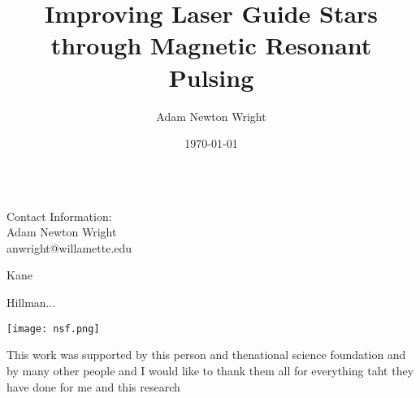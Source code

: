 \documentclass[30pt, a0paper, landscape]{tikzposter}
\title{Improving Laser Guide Stars through Magnetic Resonant Pulsing}
\author{Adam Newton Wright}
\date{\today}
\institute{Willamette University}
\begin{document}
 
\maketitle


 
{
}
 
\begin{columns}
\centering

\end{columns}


\block[]{}
{
	\begin{minipage}{.33\textwidth}
		Contact Information:\\
		Adam Newton Wright\\
		anwright@willamette.edu
	\end{minipage}
	\begin{minipage}{.33\textwidth}
		\begin{description}
			\item Kane
			\item Hillman...
		\end{description}
	\end{minipage}
	\begin{minipage}{.33\textwidth}
		\begin{minipage}{.15\textwidth}
			\texttt{[image: nsf.png]}
		\end{minipage}
		\begin{minipage}{.7\textwidth}
			This work was supported by this person and thenational science foundation and by many other people and I would like to thank them all for everything taht they have done for me and this research
		\end{minipage}
	\end{minipage}
}
 
\end{document}
